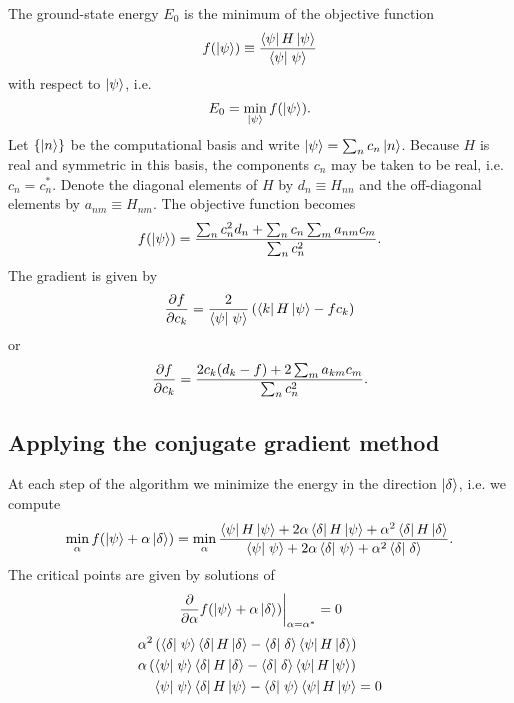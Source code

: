 The ground-state energy $E_0$ is the minimum of the objective function
\begin{equation}
  f(\ket{\psi}) 
  \equiv \frac{\matrixel{\psi}{H}{\psi}}{\braket{\psi}{\psi}}
  \label{eq:energy}
\end{equation}
with respect to $\left| \psi \right>$, i.e.
\begin{equation}
  E_0 = \min_{\left| \psi \right>} f(\left| \psi \right>).
  \label{}
\end{equation}
Let $\{\left| n \right>\}$ be the computational basis and write
$\left| \psi \right> = \sum_n c_n \left| n \right>$.
Because $H$ is real and symmetric in this basis, the components $c_n$ may be
taken to be real, i.e. $c_n=c_n^*$.
Denote the diagonal elements of $H$ by $d_n \equiv H_{n n}$ and the off-diagonal
elements by $a_{n m} \equiv H_{n m}$.
The objective function becomes
\begin{equation}
  f(\left| \psi \right>)
  = \frac{\sum_n c_n^2 d_n + \sum_n c_n \sum_m a_{n m} c_m}{\sum_n c_n^2}.
  \label{}
\end{equation}
The gradient is given by
\begin{equation}
  \pd{f}{c_k}
  = \frac{2}{\braket{\psi}{\psi}}
  \left( \matrixel{k}{H}{\psi} - f c_k \right)
  \label{eq:grad}
\end{equation}
or
\begin{equation}
  \frac{\partial f}{\partial c_k}
  = \frac{2 c_k (d_k - f) + 2 \sum_m a_{k m} c_m}{\sum_n c_n^2}.
  \label{}
\end{equation}

\subsection{Applying the conjugate gradient method}

At each step of the algorithm we minimize the energy in the direction
$\left| \delta \right>$, i.e. we compute
\begin{equation}
  \min_{\alpha} f( \ket{\psi} + \alpha \ket{\delta} )
  = \min_{\alpha}
  \frac{
      \matrixel{\psi}{H}{\psi}
      + 2 \alpha \matrixel{\delta}{H}{\psi}
      + \alpha^2 \matrixel{\delta}{H}{\delta}
    }
    {
      \braket{\psi}{\psi}
      + 2 \alpha \braket{\delta}{\psi}
      + \alpha^2 \braket{\delta}{\delta}
    }.
  \label{}
\end{equation}
The critical points are given by solutions of
\begin{equation}
  \left. \frac{\partial }{\partial \alpha} f(\left| \psi \right> + \alpha \left| \delta \right>) \right|_{\alpha=\alpha^*} = 0
  \label{}
\end{equation}
\begin{align}
  &\alpha^2 \left( \braket{\delta}{\psi} \matrixel{\delta}{H}{\delta}
    - \braket{\delta}{\delta} \matrixel{\psi}{H}{\delta} \right) \\
  &\alpha \left( \braket{\psi}{\psi} \matrixel{\delta}{H}{\delta}
    - \braket{\delta}{\delta} \matrixel{\psi}{H}{\psi} \right) \\
  &\phantom{\alpha(} \braket{\psi}{\psi} \matrixel{\delta}{H}{\psi}
    - \braket{\delta}{\psi} \matrixel{\psi}{H}{\psi} = 0
  \label{}
\end{align}

